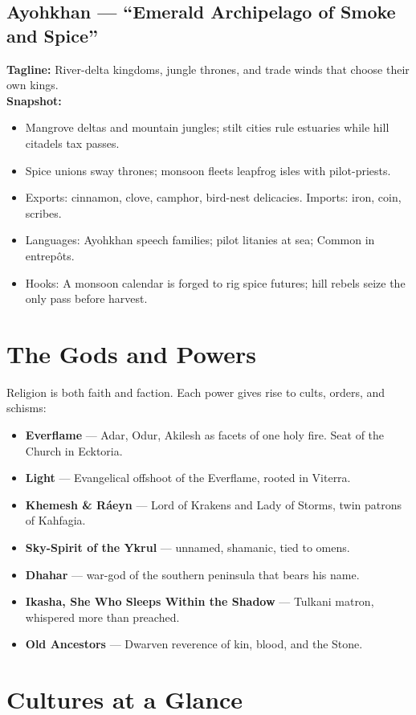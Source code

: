 \documentclass[11pt]{article}
\begin{document}
\subsection*{Ayohkhan — “Emerald Archipelago of Smoke and Spice”}
\textbf{Tagline:} River-delta kingdoms, jungle thrones, and trade winds that choose their own kings.\\
\textbf{Snapshot:}
\begin{itemize}
  \item Mangrove deltas and mountain jungles; stilt cities rule estuaries while hill citadels tax passes.
  \item Spice unions sway thrones; monsoon fleets leapfrog isles with pilot-priests.
  \item Exports: cinnamon, clove, camphor, bird-nest delicacies. Imports: iron, coin, scribes.
  \item Languages: Ayohkhan speech families; pilot litanies at sea; Common in entrepôts.
  \item Hooks: A monsoon calendar is forged to rig spice futures; hill rebels seize the only pass before harvest.
\end{itemize}

\section{The Gods and Powers}
Religion is both faith and faction. Each power gives rise to cults, orders, and schisms:
\begin{itemize}
  \item \textbf{Everflame} — Adar, Odur, Akilesh as facets of one holy fire. Seat of the Church in Ecktoria.  
  \item \textbf{Light} — Evangelical offshoot of the Everflame, rooted in Viterra.  
  \item \textbf{Khemesh \& Ráeyn} — Lord of Krakens and Lady of Storms, twin patrons of Kahfagia.  
  \item \textbf{Sky-Spirit of the Ykrul} — unnamed, shamanic, tied to omens.  
  \item \textbf{Dhahar} — war-god of the southern peninsula that bears his name.  
  \item \textbf{Ikasha, She Who Sleeps Within the Shadow} — Tulkani matron, whispered more than preached.  
  \item \textbf{Old Ancestors} — Dwarven reverence of kin, blood, and the Stone.  
\end{itemize}

\section{Cultures at a Glance}
\end{document}

